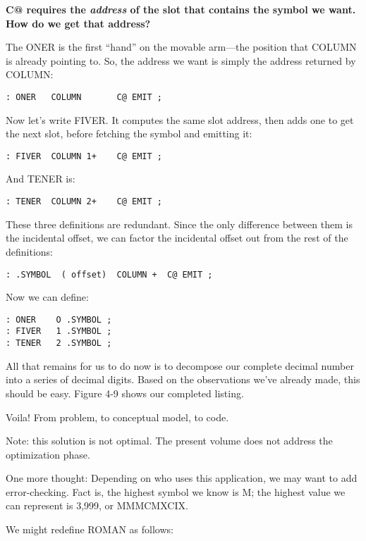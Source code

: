 \bf{C@} requires the \emph{address} of the slot that contains the symbol we
want. How do we get that address?

The ONER is the first ``hand'' on the movable arm---the position
that COLUMN is already pointing to. So, the address we want is simply
the address returned by COLUMN:

\begin{verbatim}
: ONER   COLUMN       C@ EMIT ;
\end{verbatim}

Now let's write FIVER. It computes the same slot address, then adds
one to get the next slot, before fetching the symbol and emitting it:

\begin{verbatim}
: FIVER  COLUMN 1+    C@ EMIT ;
\end{verbatim}

And TENER is:

\begin{verbatim}
: TENER  COLUMN 2+    C@ EMIT ;
\end{verbatim}

These three definitions are redundant. Since the only difference between
them is the incidental offset, we can factor the incidental offset out from
the rest of the definitions:

\begin{verbatim}
: .SYMBOL  ( offset)  COLUMN +  C@ EMIT ;
\end{verbatim}

Now we can define:

\begin{verbatim}
: ONER    O .SYMBOL ;
: FIVER   1 .SYMBOL ;
: TENER   2 .SYMBOL ;
\end{verbatim}

All that remains for us to do now is to decompose our complete decimal
number into a series of decimal digits. Based on the observations we've
already made, this should be easy. Figure 4-9 shows our completed
listing.

Voila! From problem, to conceptual model, to code.

Note: this solution is not optimal. The present volume does not address
the optimization phase.

One more thought: Depending on who uses this application, we may
want to add error-checking. Fact is, the highest symbol we know is M; the
highest value we can represent is 3,999, or MMMCMXCIX.

We might redefine ROMAN as follows:

